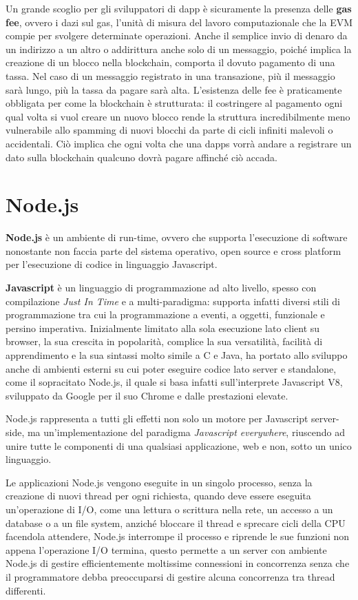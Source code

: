 Un grande scoglio per gli sviluppatori di dapp è sicuramente la presenza
delle \textbf{gas fee}, ovvero i dazi sul \textsf{gas}, l'unità di misura del
lavoro computazionale che la EVM compie per svolgere determinate operazioni.
Anche il semplice invio di denaro da un indirizzo a un altro o addirittura anche
solo di un messaggio, poiché implica la creazione di un blocco nella blockchain,
comporta il dovuto pagamento di una tassa. Nel caso di un messaggio registrato in
una transazione, più il messaggio sarà lungo, più la tassa da pagare sarà alta.
L'esistenza delle fee è praticamente obbligata per come la blockchain è strutturata:
il costringere al pagamento ogni qual volta si vuol creare un nuovo blocco rende
la struttura incredibilmente meno vulnerabile allo spamming di nuovi blocchi da
parte di cicli infiniti malevoli o accidentali.
Ciò implica che ogni volta che una dapps vorrà andare a registrare un dato sulla
blockchain qualcuno dovrà pagare affinché ciò accada. 

\section{Node.js}

\textbf{Node.js} è un ambiente di run-time, ovvero che supporta l'esecuzione di
software nonostante non faccia parte del sistema operativo, open source e cross
platform per l'esecuzione di codice in linguaggio Javascript.

\textbf{Javascript} è un linguaggio di programmazione ad alto livello,
spesso con compilazione \emph{Just In Time} e a multi-paradigma: supporta infatti diversi
stili di programmazione tra cui la programmazione a eventi, a oggetti,
funzionale e persino imperativa.
Inizialmente limitato alla sola esecuzione lato client su browser,
la sua crescita in popolarità, complice la sua versatilità, facilità
di apprendimento e la sua sintassi molto simile a C e Java, ha portato
allo sviluppo anche di ambienti esterni su cui poter eseguire codice lato server
e standalone, come il sopracitato Node.js, il quale si basa infatti sull'interprete
Javascript V8, sviluppato da Google per il suo Chrome e dalle prestazioni elevate.

Node.js rappresenta a tutti gli effetti non solo un motore per Javascript server-side,
ma un'implementazione del paradigma \emph{Javascript everywhere}, riuscendo ad unire
tutte le componenti di una qualsiasi applicazione, web e non, sotto un unico linguaggio.

Le applicazioni Node.js vengono eseguite in un singolo processo, senza la creazione di
nuovi thread per ogni richiesta, quando deve essere eseguita un'operazione di I/O,
come una lettura o scrittura nella rete, un accesso a un database o a un file system,
anziché bloccare il thread e sprecare cicli della CPU facendola attendere, Node.js
interrompe il processo e riprende le sue funzioni non appena l'operazione I/O termina,
questo permette a un server con ambiente Node.js di gestire efficientemente moltissime
connessioni in concorrenza senza che il programmatore debba preoccuparsi di gestire
alcuna concorrenza tra thread differenti.

